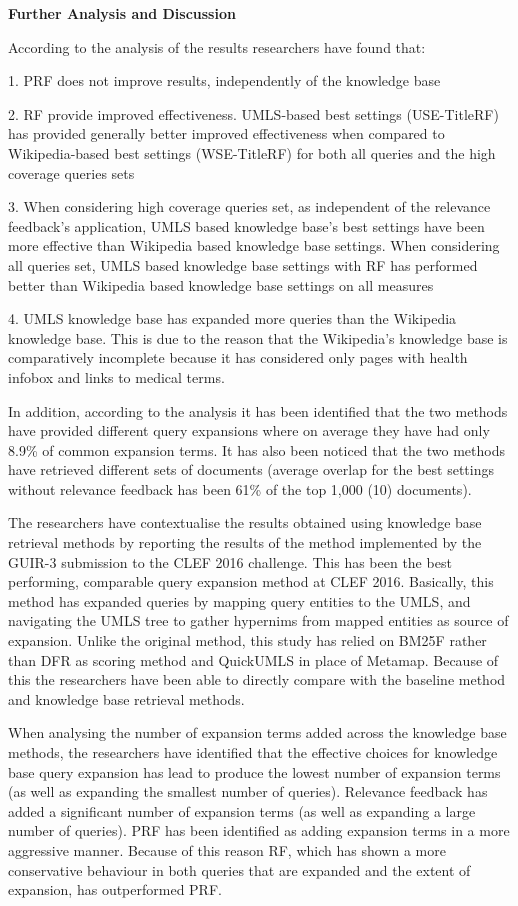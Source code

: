 \documentclass[]{article}
\begin{document}
\textbf{Further Analysis and Discussion} 

According to the analysis of the results researchers have found that:

1.	PRF does not improve results, independently of the knowledge base

2.	RF provide improved effectiveness. UMLS-based best settings (USE-TitleRF) has provided generally better improved effectiveness when compared to Wikipedia-based best settings (WSE-TitleRF) for both all queries and the high coverage queries sets

3.	When considering high coverage queries set, as independent of the relevance feedback’s application, UMLS based knowledge base’s best settings have been more effective than Wikipedia based knowledge base settings. When considering all queries set, UMLS based knowledge base settings with RF has performed better than Wikipedia based knowledge base settings on all measures

4.	UMLS knowledge base has expanded more queries than the Wikipedia knowledge base. This is due to the reason that the Wikipedia’s knowledge base is comparatively incomplete because it has considered only pages with health infobox and links to medical terms. 

In addition, according to the analysis it has been identified that the two methods have provided different query expansions where on average they have had only 8.9\% of common expansion terms. It has also been noticed that the two methods have retrieved different sets of documents (average overlap for the best settings without relevance feedback has been 61\% of the top 1,000 (10) documents). 

The researchers have contextualise the results obtained using knowledge base retrieval methods by reporting the results of the method implemented by the GUIR-3 submission to the CLEF 2016 challenge. This has been the best performing, comparable query expansion method at CLEF 2016. Basically, this method has expanded queries by mapping query entities to the UMLS, and navigating the UMLS tree to gather hypernims from mapped entities as source of expansion. Unlike the original method, this study has relied on BM25F rather than DFR as scoring method and QuickUMLS in place of Metamap. Because of this the researchers have been able to directly compare with the baseline method and knowledge base retrieval methods.    

When analysing the number of expansion terms added across the knowledge base methods, the researchers have identified that the effective choices for knowledge base query expansion has lead to produce the lowest number of expansion terms (as well as expanding the smallest number of queries). Relevance feedback has added a significant number of expansion terms (as well as expanding a large number of queries). PRF has been identified as adding expansion terms in a more aggressive manner. Because of this reason RF, which has shown a more conservative behaviour in both queries that are expanded and the extent of expansion, has outperformed PRF.  
\end{document}

